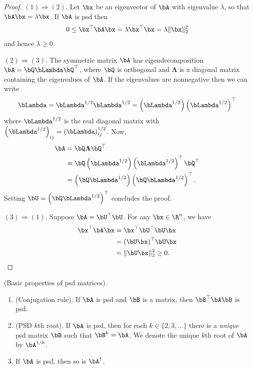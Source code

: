 \begin{proof}\hfill

    $(1)\Longrightarrow (2)$. Let $\bx$ be an eigenvector of $\bA$ with
    eigenvalue
    $\lambda$, so that $\bA\bx = \lambda\bx$. If $\bA$ is psd then
    \begin{align*}
        0\leq \bx^\top\bA\bx = \lambda\bx^\top\bx = \lambda \|\bx\|^2_2
    \end{align*}
    and hence $\lambda\geq 0$.

    $(2)\Longrightarrow (3)$. The symmetric matrix $\bA$ has eigendecomposition
    $\bA = \bQ\bLambda\bQ^\top$, where $\bQ$ is orthogonal and
    $\mathbf{\Lambda}$ is a diagonal matrix containing the eigenvalues of $\bA$. If the eigenvalues are nonnegative then we can write
    \[\bLambda = \bLambda^{1/2}\bLambda^{1/2} = \left(\bLambda^{1/2}\right)\left(\bLambda^{1/2}\right)^\top\]
    where $\bLambda^{1/2}$ is the real diagonal matrix with $\left(\bLambda^{1/2}\right)_{ij} = (\bLambda)_{ij}^{1/2}$. Now,
    \begin{align*}
        \bA & = \bQ\mathbf\Lambda\bQ^\top \\
            & = \bQ\left(\bLambda^{1/2}\right)\left(\bLambda^{1/2}\right)^\top\bQ^\top    \\
            & = \left(\bQ\bLambda^{1/2}\right)\left(\bQ\bLambda^{1/2}\right)^\top.
    \end{align*}
    Setting $\bU = \left(\bQ\bLambda^{1/2}\right)^\top$ concludes the proof.

    $(3)\Longrightarrow (1)$. Suppose $\bA = \bU^\top\bU$. For any
    $\bx\in\R^n$, we
    have
    \begin{align*}
        \bx^\top\bA\bx & = \bx^\top\bU^\top\bU\bx \\
                       & = (\bU\bx)^\top\bU\bx    \\
                       & = \|\bU\bx\|^2_2\geq 0.
    \end{align*}
\end{proof}

\begin{proposition}{(Basic properties of psd matrices).}\label{prop:psd-props}\,
    \begin{enumerate}
        \item (Conjugation rule). If $\bA$ is psd and $\bB$ is a matrix, then $\bB^\top\bA\bB$ is psd.
        \item (PSD $k$th root). If $\bA$ is psd, then for each $k\in \{2,3,\ldots\}$ there is a \textit{unique} psd matrix $\bB$ such that $\bB^k = \bA$. We denote the unique $k$th root of $\bA$ by $\bA^{1/k}$. 
        \item If $\bA$ is psd, then so is $\bA^\dagger$.
    \end{enumerate}
\end{proposition}

